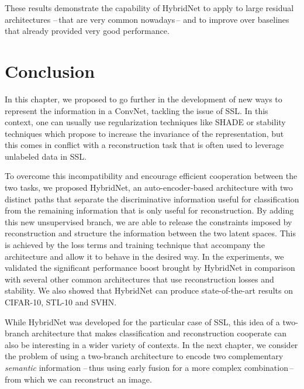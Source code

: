 These results demonstrate the capability of HybridNet to apply to large residual architectures --\,that are very common nowadays\,-- and to improve over baselines that already provided very good performance.


\section{Conclusion}

In this chapter, we proposed to go further in the development of new ways to represent the information in a \acf{ConvNet}, tackling the issue of \acf{SSL}. In this context, one can usually use regularization techniques like \ac{SHADE} or stability techniques which propose to increase the invariance of the representation, but this comes in conflict with a reconstruction task that is often used to leverage unlabeled data in \ac{SSL}.

To overcome this incompatibility and encourage efficient cooperation between the two tasks, we proposed HybridNet, an auto-encoder-based architecture with two distinct paths that separate the discriminative information useful for classification from the remaining information that is only useful for reconstruction. By adding this new unsupervised branch, we are able to release the constraints imposed by reconstruction and structure the information between the two latent spaces. This is achieved by the loss terms and training technique that accompany the architecture and allow it to behave in the desired way. In the experiments, we validated the significant performance boost brought by HybridNet in comparison with several other common architectures that use reconstruction losses and stability. We also showed that HybridNet can produce state-of-the-art results on CIFAR-10, STL-10 and SVHN.

While HybridNet was developed for the particular case of \ac{SSL}, this idea of a two-branch architecture that makes classification and reconstruction cooperate can also be interesting in a wider variety of contexts. In the next chapter, we consider the problem of using a two-branch architecture to encode two complementary \textit{semantic} information --\,thus using early fusion for a more complex combination\,-- from which we can reconstruct an image.
